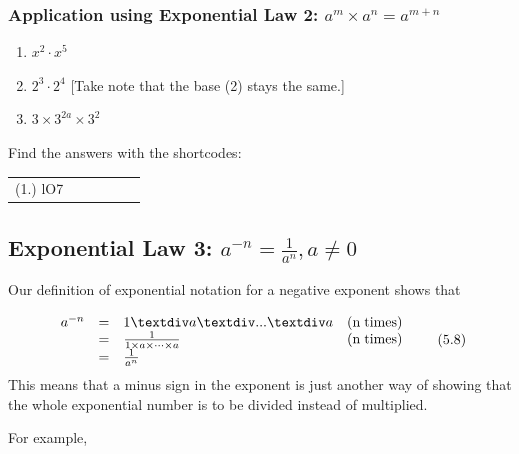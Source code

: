             \subsubsection{  Application using Exponential Law 2: ${a}^{m}\ensuremath{\times}{a}^{n}={a}^{m+n}$ }
            \nopagebreak
        \label{m38359*id64269}\begin{enumerate}[noitemsep, label=\textbf{\arabic*}. ] 
            \label{m38359*uid13}\item 
            ${x}^{2}\ensuremath{\cdot}{x}^{5}$
      \label{m38359*uid14}\item 
        ${2}^{3}\ensuremath{\cdot}{2}^{4}$
        [Take note that the base (2) stays the same.]
      \label{m38359*uid15}\item 
        $3\ensuremath{\times}{3}^{2a}\ensuremath{\times}{3}^{2}$
\newline
\newline
          \end{enumerate}
      \label{m38359*uid16}
\par {} Find the answers with the shortcodes:
 \par \begin{tabular}[h]{cccccc}
 (1.) lO7  & \end{tabular}
            \subsection{ Exponential Law 3: ${a}^{-n}=\frac{1}{{a}^{n}},a\ne 0$}
            \nopagebreak
        \label{m38359*id64482}Our definition of exponential notation for a negative exponent shows that\par 
        \label{m38359*uid17}\nopagebreak\noindent{}
    \begin{equation}
    \begin{array}{cccc}\hfill {a}^{-n}& =& 1÷a÷...÷a\hfill & \left(\mathrm{n\; times}\right)\hfill \\ \hfill & =& \frac{1}{1\ensuremath{\times}a\ensuremath{\times}\cdots \ensuremath{\times}a}\hfill & \left(\mathrm{n\; times}\right)\hfill \\ \hfill & =& \frac{1}{{a}^{n}}\hfill & \end{array}\tag{5.8}
      \end{equation}
        \label{m38359*id64624}This means that a minus sign in the exponent is just another way of showing that the whole exponential number is to be divided instead of multiplied.\par 
        \label{m38359*id64630}For example,\par 
        \label{m38359*id64634}\nopagebreak\noindent{}
          
